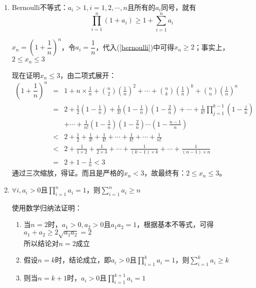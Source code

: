 \documentclass[11pt,fleqn]{book} %
\begin{document}
\begin{enumerate}
\item Bernoulli不等式：$a_i>1, i = 1,2,\cdots, n$且所有的$a_i$同号，就有
\begin{equation}\label{bernoulli}
  \prod_{i=1}^{n}(1+a_i) \geqslant 1+\sum_{i=1}^{n}a_i
\end{equation}
\begin{example}
$x_n=\left(1+\dfrac{1}{n}\right)^n$，令$a_i=\dfrac{1}{n}$，代入(\ref{bernoulli})中可得$x_n\geqslant 2$；事实上，$2\leqslant x_n \leqslant 3$
\end{example}
\begin{prove}
现在证明$x_n \leqslant 3$，由二项式展开：
\begin{eqnarray*}
  \left(1+\dfrac{1}{n}\right)^n &=& 1+n\times \frac{1}{n}+\binom{n}{2}\left(\frac{1}{n}\right)^2+\cdots+\binom{n}{k}\left(\frac{1}{n}\right)^k+\binom{n}{n}\left(\frac{1}{n}\right)^n \\
  ~ &=& 2+\frac{1}{2}\left(1-\frac{1}{n}\right)+\frac{1}{3!}\left(1-\frac{1}{n}\right)\left(1-\frac{2}{n}\right)+\cdots+\frac{1}{k!}\prod_{j=1}^{k-1}\left(1-\frac{j}{n}\right)\\
  ~&~&+\cdots+\frac{1}{n!}\left(1-\frac{1}{n}\right)\left(1-\frac{2}{n}\right)\cdots\left(1-\frac{n-1}{n}\right)\\
  ~ &<& 2+\frac{1}{2}+\frac{1}{3!}+\frac{1}{4!}+\cdots+\frac{1}{k!}+\cdots+\frac{1}{n!} \\
  ~ &<& 2+\frac{1}{1\times 2}+\frac{1}{2\times 3}+\cdots+\frac{1}{(k-1)\times k}+\cdots+ \frac{1}{(n-1)\times n} \\
  ~ &=& 2+1-\frac{1}{n}<3
\end{eqnarray*}
通过三次缩放，得证。而且是严格的$x_n<3$，故最终有：$2\leqslant x_n \leqslant 3$。
\end{prove}
\item $\forall i, a_i>0$且$\prod\limits_{i=1}^{n}a_i = 1$，则$\sum\limits_{i=1}^{n}a_i \geqslant n$
\begin{prove}使用数学归纳法证明：
\begin{enumerate}[label=(\arabic*)]
  \item 当$n=2$时，$a_1>0, a_2>0$且$a_1a_2=1$，根据基本不等式，可得$a_1+a_2\geqslant 2 \sqrt{a_1a_2}=2$\\
        所以结论对$n=2$成立
  \item 假设$n=k$时，结论成立，即$a_i>0$且$\prod\limits_{i=1}^{k}a_i = 1$，则$\sum\limits_{i=1}^{k}a_i \geqslant k$
  \item 则当$n=k+1$时，$a_i>0$且$\prod\limits_{i=1}^{k+1}a_i = 1$\\

\end{enumerate}
\end{prove}
\end{enumerate}
\end{document}
